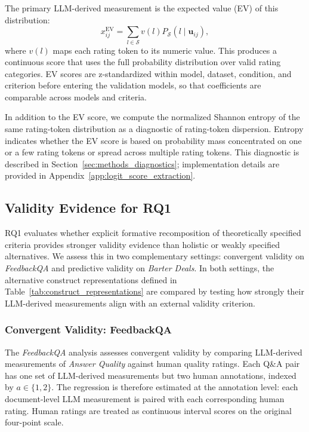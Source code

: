 The primary LLM-derived measurement is the expected value (EV) of this distribution:
\begin{equation}\label{eq:weighted_score}
x_{ij}^{\mathrm{EV}} =
\sum_{l \in \mathcal{S}} v(l) P_{\mathcal{S}}(l \mid \mathbf{u}_{ij}),
\end{equation}
where $v(l)$ maps each rating token to its numeric value. This produces a continuous score that uses the full probability distribution over valid rating categories. EV scores are z-standardized within model, dataset, condition, and criterion before entering the validation models, so that coefficients are comparable across models and criteria.

In addition to the EV score, we compute the normalized Shannon entropy of the same rating-token distribution as a diagnostic of rating-token dispersion. Entropy indicates whether the EV score is based on probability mass concentrated on one or a few rating tokens or spread across multiple rating tokens. This diagnostic is described in Section~\ref{sec:methods_diagnostics}; implementation details are provided in Appendix~\ref{app:logit_score_extraction}.



\subsection{Validity Evidence for RQ1}\label{sec:methods_rq1}

RQ1 evaluates whether explicit formative recomposition of theoretically specified criteria provides stronger validity evidence than holistic or weakly specified alternatives. We assess this in two complementary settings: convergent validity on \textit{FeedbackQA} and predictive validity on \textit{Barter Deals}. In both settings, the alternative construct representations defined in Table~\ref{tab:construct_representations} are compared by testing how strongly their LLM-derived measurements align with an external validity criterion.

\subsubsection{Convergent Validity: FeedbackQA}\label{sec:methods_feedbackqa}

The \textit{FeedbackQA} analysis assesses convergent validity by comparing LLM-derived measurements of \textit{Answer Quality} against human quality ratings. Each Q\&A pair has one set of LLM-derived measurements but two human annotations, indexed by $a \in \{1,2\}$. The regression is therefore estimated at the annotation level: each document-level LLM measurement is paired with each corresponding human rating. Human ratings are treated as continuous interval scores on the original four-point scale.

